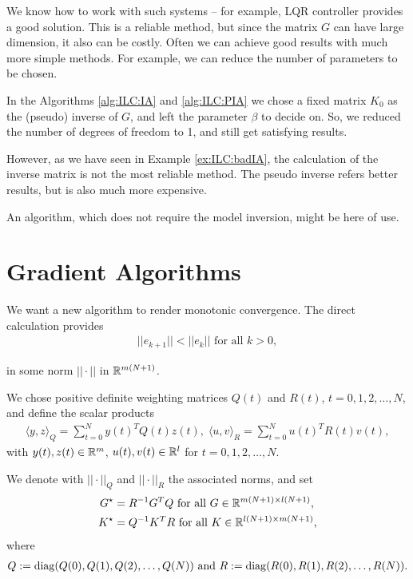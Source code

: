 We know how to work with such systems -- for example, LQR controller provides a good solution. This is a reliable method, but since the matrix $G$ can have large dimension, it also can be costly. Often we can achieve good results with much more simple methods. For example, we can reduce the number of parameters to be chosen. 

In the Algorithms \ref{alg:ILC:IA} and \ref{alg:ILC:PIA} we chose a fixed matrix $K_0$ as the (pseudo) inverse of $G$, and left the parameter $\beta$ to decide on. So, we reduced the number of degrees of freedom to 1, and still get satisfying results.


However, as we have seen in Example \ref{ex:ILC:badIA}, the calculation of the  inverse matrix is not the most reliable method. The pseudo inverse refers better results, but is also much more expensive. 

An algorithm, which does not require the model inversion, might be here of use. 

	 \section{Gradient Algorithms}
We want a new algorithm to render monotonic convergence. 
The direct calculation provides 
\begin{align}
\label{eq:monConv}
||e_{k+1}|| < ||e_k|| \text{ for all } k >0,
\end{align}

in some norm $|| \cdot || $ in ${\mathbb{R}}^{m(N+1)}$. 

We chose positive definite weighting matrices $Q(t)$ and $R(t)$, $t = 0, 1, 2, \dots ,N$, and define the scalar products
\begin{align}
\label{eq:SkPrQR}
\langle y,z\rangle_Q = \sum_{t = 0}^N y(t)^TQ(t)z(t), \; \langle u,v\rangle_R = \sum_{t = 0}^N u(t)^T R(t) v(t),
\end{align}
with $y(t), z(t) \in {\mathbb{R}}^{m}$, $u(t), v(t) \in {\mathbb{R}}^l$ for $t = 0,1,2, \dots, N$.

We denote with $||\cdot||_Q$ and $||\cdot||_R$ the associated norms, and set
\begin{align*}
G^\star &= R^{-1} G^T Q \text{ for all } G \in {\mathbb{R}}^{m(N+1)\times l(N+1)},\\
K^\star &= Q^{-1} K^T R \text{ for all } K \in {\mathbb{R}}^{l(N+1)\times m(N+1)},
\end{align*}
where 
\begin{align}
Q := \operatorname*{diag}(Q(0), Q(1), Q(2) ,\dots, Q(N)) \text{ and } R:= \operatorname*{diag}(R(0), R(1), R(2), \dots, R(N)).
\end{align}

